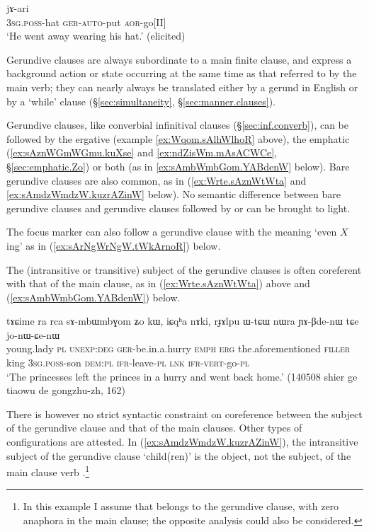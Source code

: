 \begin{exe}
\ex \label{ex:Wrte.sAznWtWta}
 jɤ-ari \\
\textsc{3sg}.\textsc{poss}-hat \textsc{ger}-\textsc{auto}-put \textsc{aor}-go[II] \\
\glt `He went away wearing his hat.' (elicited)
\end{exe}

Gerundive clauses are always subordinate to a main finite clause, and express a background action or state occurring at the same time as that referred to by the main verb; they can nearly always be translated either by a gerund in English or by a `while' clause (§\ref{sec:simultaneity}, §\ref{sec:manner.clauses}).

Gerundive clauses, like converbial infinitival clauses (§\ref{sec:inf.converb}), can be followed by the ergative  (example \ref{ex:Wqom.sAlhWlhoR} above), the emphatic  (\ref{ex:sAznWGmWGmu.kuXse} and \ref{ex:ndZisWm.mAsACWCe}, §\ref{sec:emphatic.Zo}) or both (as in \ref{ex:sAmbWmbGom.YABdenW} below). Bare gerundive clauses are also common, as in (\ref{ex:Wrte.sAznWtWta} and \ref{ex:sAmdzWmdzW.kuzrAZinW} below). No semantic difference between bare gerundive clauses and gerundive clauses followed by  or  can be brought to light. 

The focus marker  can also follow a gerundive clause with the meaning `even $X$ing' as in (\ref{ex:sArNgWrNgW.tWkArnoR}) below.

The (intransitive or transitive) subject of the gerundive clauses is often coreferent with that of the main clause, as in (\ref{ex:Wrte.sAznWtWta}) above and (\ref{ex:sAmbWmbGom.YABdenW}) below.

\begin{exe}
\ex \label{ex:sAmbWmbGom.YABdenW}
\gll tɤɕime ra rca sɤ-mbɯ\redp{}mbɣom ʑo kɯ, iɕqʰa nɤki, rɟɤlpu ɯ-tɕɯ nɯra ɲɤ-βde-nɯ tɕe jo-nɯ-ɕe-nɯ \\
young.lady \textsc{pl} \textsc{unexp}:\textsc{deg} \textsc{ger}-be.in.a.hurry \textsc{emph} \textsc{erg} the.aforementioned \textsc{filler} king \textsc{3sg}.\textsc{poss}-son \textsc{dem}:\textsc{pl} \textsc{ifr}-leave-\textsc{pl} \textsc{lnk} \textsc{ifr}-\textsc{vert}-go-\textsc{pl} \\
\glt `The princesses left the princes in a hurry and went back home.' (140508 shier ge tiaowu de gongzhu-zh, 162)
\end{exe}

There is however no strict syntactic constraint on coreference between the subject of the gerundive clause and that of the main clauses. Other types of configurations are attested. In (\ref{ex:sAmdzWmdzW.kuzrAZinW}), the intransitive subject of the gerundive clause  `child(ren)' is the object, not the subject, of the main clause verb .\footnote{In this example I assume that  belongs to the gerundive clause, with zero anaphora in the main clause; the opposite analysis could also be considered.}

